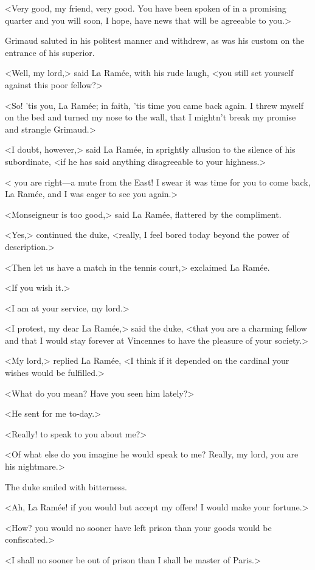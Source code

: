 <Very good, my friend, very good. You have been spoken of in a promising quarter and you will soon, I hope, have news that will be agreeable to you.>

Grimaud saluted in his politest manner and withdrew, as was his custom on the entrance of his superior.

<Well, my lord,> said La Ramée, with his rude laugh, <you still set yourself against this poor fellow?>

<So! 'tis you, La Ramée; in faith, 'tis time you came back again. I threw myself on the bed and turned my nose to the wall, that I mightn't break my promise and strangle Grimaud.>

<I doubt, however,> said La Ramée, in sprightly allusion to the silence of his subordinate, <if he has said anything disagreeable to your highness.>

< you are right—a mute from the East! I swear it was time for you to come back, La Ramée, and I was eager to see you again.>

<Monseigneur is too good,> said La Ramée, flattered by the compliment.

<Yes,> continued the duke, <really, I feel bored today beyond the power of description.>

<Then let us have a match in the tennis court,> exclaimed La Ramée.

<If you wish it.>

<I am at your service, my lord.>

<I protest, my dear La Ramée,> said the duke, <that you are a charming fellow and that I would stay forever at Vincennes to have the pleasure of your society.>

<My lord,> replied La Ramée, <I think if it depended on the cardinal your wishes would be fulfilled.>

<What do you mean? Have you seen him lately?>

<He sent for me to-day.>

<Really! to speak to you about me?>

<Of what else do you imagine he would speak to me? Really, my lord, you are his nightmare.>

The duke smiled with bitterness.

<Ah, La Ramée! if you would but accept my offers! I would make your fortune.>

<How? you would no sooner have left prison than your goods would be confiscated.>

<I shall no sooner be out of prison than I shall be master of Paris.>

